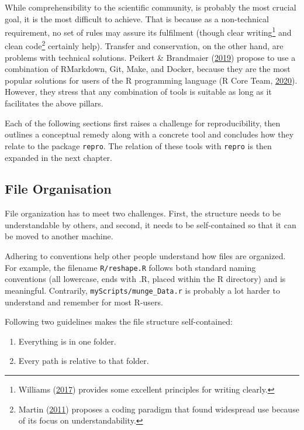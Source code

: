 \documentclass[12pt,a4paper,]{article}
\providecommand{\tightlist}{%
  \setlength{\itemsep}{0pt}\setlength{\parskip}{0pt}}
\begin{document}
While comprehensibility to the scientific community, is probably the most crucial goal, it is the most difficult to achieve.
That is because as a non-technical requirement, no set of rules may assure its fulfilment (though clear writing\footnote{Williams (\protect\hyperlink{ref-williamsStyleLessonsClarity2017}{2017}) provides some excellent principles for writing clearly.} and clean code\footnote{Martin (\protect\hyperlink{ref-martinCleanCoderCode2011}{2011}) proposes a coding paradigm that found widespread use because of its focus on understandability.} certainly help).
Transfer and conservation, on the other hand, are problems with technical solutions.
Peikert \& Brandmaier (\protect\hyperlink{ref-peikertReproducibleDataAnalysis2019}{2019}) propose to use a combination of RMarkdown, Git, Make, and Docker, because they are the most popular solutions for users of the R programming language (R Core Team, \protect\hyperlink{ref-R-base}{2020}).
However, they stress that any combination of tools is suitable as long as it facilitates the above pillars.

Each of the following sections first raises a challenge for reproducibility, then outlines a conceptual remedy along with a concrete tool and concludes how they relate to the package \texttt{repro}. The relation of these tools with \texttt{repro} is then expanded in the next chapter.

\hypertarget{file-organisation}{%
\subsection{File Organisation}\label{file-organisation}}

File organization has to meet two challenges. First, the structure needs to be understandable by others, and second, it needs to be self-contained so that it can be moved to another machine.

Adhering to conventions help other people understand how files are organized.
For example, the filename \texttt{R/reshape.R} follows both standard naming conventions (all lowercase, ends with .R, placed within the R directory) and is meaningful. Contrarily, \texttt{myScripts/munge\_Data.r} is probably a lot harder to understand and remember for most R-users.

Following two guidelines makes the file structure self-contained:

\begin{enumerate}
\def\labelenumi{\arabic{enumi}.}
\tightlist
\item
  Everything is in one folder.
\item
  Every path is relative to that folder.
\end{enumerate}
\end{document}
